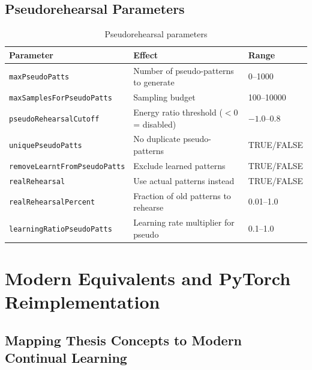 \documentclass[11pt,a4paper]{article}
\begin{document}
\subsection{Pseudorehearsal Parameters}
\begin{table}[h]
\centering\small
\begin{tabular}{lp{5cm}l}
\toprule
\textbf{Parameter} & \textbf{Effect} & \textbf{Range} \\
\midrule
\texttt{maxPseudoPatts} & Number of pseudo-patterns to generate & 0--1000 \\
\texttt{maxSamplesForPseudoPatts} & Sampling budget & 100--10000 \\
\texttt{pseudoRehearsalCutoff} & Energy ratio threshold ($<0$ = disabled) & $-1.0$--$0.8$ \\
\texttt{uniquePseudoPatts} & No duplicate pseudo-patterns & TRUE/FALSE \\
\texttt{removeLearntFromPseudoPatts} & Exclude learned patterns & TRUE/FALSE \\
\texttt{realRehearsal} & Use actual patterns instead & TRUE/FALSE \\
\texttt{realRehearsalPercent} & Fraction of old patterns to rehearse & 0.01--1.0 \\
\texttt{learningRatioPseudoPatts} & Learning rate multiplier for pseudo & 0.1--1.0 \\
\bottomrule
\end{tabular}
\caption{Pseudorehearsal parameters}
\end{table}

\section{Modern Equivalents and PyTorch Reimplementation}

\subsection{Mapping Thesis Concepts to Modern Continual Learning}
\end{document}

